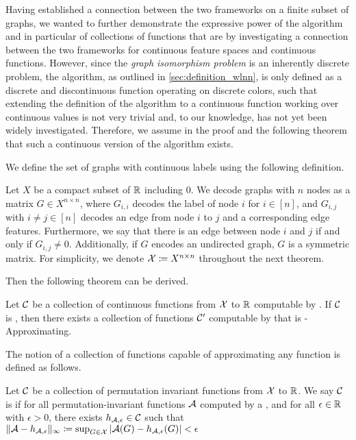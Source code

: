 Having established a connection between the two frameworks on a finite subset of graphs, we wanted to further demonstrate the expressive power of the \wl algorithm and in particular of collections of functions that are \wldisc by investigating a connection between the two frameworks for continuous feature spaces and continuous functions. However, since the \textit{graph isomorphism problem} is an inherently discrete problem, the \wl algorithm, as outlined in \cref{sec:definition_wlnn}, is only defined as a discrete and discontinuous function operating on discrete colors, such that extending the definition of the \wl algorithm to a continuous function working over continuous values is not very trivial and, to our knowledge, has not yet been widely investigated. Therefore, we assume in the proof and the following theorem that such a continuous version of the \wl algorithm exists.

We define the set of graphs with continuous labels using the following definition.
\begin{definition}
    Let $X$ be a compact subset of $\mathbb{R}$ including $0$. We decode graphs with $n$ nodes as a matrix $G \in X^{n \times n}$, where $G_{i,i}$ decodes the label of node $i$ for $i \in [n]$, and $G_{i,j}$ with $i \neq j \in [n]$ decodes an edge from node $i$ to $j$ and a corresponding edge features. Furthermore, we say that there is an edge between node $i$ and $j$ if and only if $G_{i,j} \neq 0$. Additionally, if $G$ encodes an undirected graph, $G$ is a symmetric matrix. For simplicity, we denote $\mathcal{X} \coloneqq X^{n \times n}$ throughout the next theorem.
\end{definition}

Then the following theorem can be derived.

\begin{theorem}\label{theorem:1wl_in_gnn_approximating}
    Let $\mathcal{C}$ be a collection of continuous functions from $\mathcal{X}$ to $\mathbb{R}$ computable by \wlnn. If $\mathcal{C}$ is \wldisc, then there exists a collection of functions $\mathcal{C}'$ computable by \wlnn that is \gnn-Approximating.
\end{theorem}

The notion of a collection of functions capable of approximating any \gnn function is defined as follows.
\begin{definition}[\gapp]
    Let $\mathcal{C}$ be a collection of permutation invariant functions from $\mathcal{X}$ to $\mathbb{R}$. We say $\mathcal{C}$ is \gapp if for all permutation-invariant functions $\mathcal{A}$ computed by a \gnn, and for all $\epsilon \in \mathbb{R}$ with $\epsilon > 0$, there exists $h_{\mathcal{A},\epsilon} \in \mathcal{C}$ such that $\| \mathcal{A} - h_{\mathcal{A},\epsilon} \|_\infty \coloneqq \sup_{G \in \mathcal{X}} |\mathcal{A}(G) - h_{\mathcal{A},\epsilon}(G)| < \epsilon$
\end{definition}

